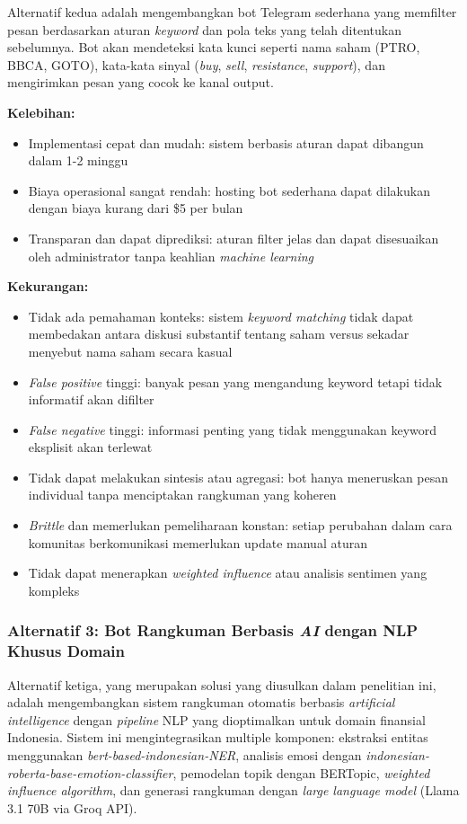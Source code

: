 Alternatif kedua adalah mengembangkan bot Telegram sederhana yang memfilter pesan berdasarkan aturan \textit{keyword} dan pola teks yang telah ditentukan sebelumnya. Bot akan mendeteksi kata kunci seperti nama saham (PTRO, BBCA, GOTO), kata-kata sinyal (\textit{buy}, \textit{sell}, \textit{resistance}, \textit{support}), dan mengirimkan pesan yang cocok ke kanal output.

\textbf{Kelebihan:}
\begin{itemize}
\item Implementasi cepat dan mudah: sistem berbasis aturan dapat dibangun dalam 1-2 minggu
\item Biaya operasional sangat rendah: hosting bot sederhana dapat dilakukan dengan biaya kurang dari \$5 per bulan
\item Transparan dan dapat diprediksi: aturan filter jelas dan dapat disesuaikan oleh administrator tanpa keahlian \textit{machine learning}
\end{itemize}

\textbf{Kekurangan:}
\begin{itemize}
\item Tidak ada pemahaman konteks: sistem \textit{keyword matching} tidak dapat membedakan antara diskusi substantif tentang saham versus sekadar menyebut nama saham secara kasual
\item \textit{False positive} tinggi: banyak pesan yang mengandung keyword tetapi tidak informatif akan difilter
\item \textit{False negative} tinggi: informasi penting yang tidak menggunakan keyword eksplisit akan terlewat
\item Tidak dapat melakukan sintesis atau agregasi: bot hanya meneruskan pesan individual tanpa menciptakan rangkuman yang koheren
\item \textit{Brittle} dan memerlukan pemeliharaan konstan: setiap perubahan dalam cara komunitas berkomunikasi memerlukan update manual aturan
\item Tidak dapat menerapkan \textit{weighted influence} atau analisis sentimen yang kompleks
\end{itemize}

\subsubsection{Alternatif 3: Bot Rangkuman Berbasis \textit{AI} dengan NLP Khusus Domain}

Alternatif ketiga, yang merupakan solusi yang diusulkan dalam penelitian ini, adalah mengembangkan sistem rangkuman otomatis berbasis \textit{artificial intelligence} dengan \textit{pipeline} NLP yang dioptimalkan untuk domain finansial Indonesia. Sistem ini mengintegrasikan multiple komponen: ekstraksi entitas menggunakan \textit{bert-based-indonesian-NER}, analisis emosi dengan \textit{indonesian-roberta-base-emotion-classifier}, pemodelan topik dengan BERTopic, \textit{weighted influence algorithm}, dan generasi rangkuman dengan \textit{large language model} (Llama 3.1 70B via Groq API).

